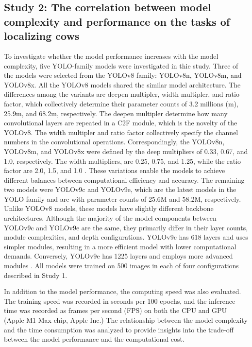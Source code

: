 \subsection*{Study 2: The correlation between model complexity and performance on the tasks of localizing cows}

To investigate whether the model performance increases with the model complexity, five YOLO-family models were investigated in thie study. Three of the models were selected from the YOLOv8 family: YOLOv8n, YOLOv8m, and YOLOv8x. All the YOLOv8 models shared the similar model architecture. The differences among the variants are deepen multipler, width multipler, and ratio factor, which collectively determine their parameter counts of 3.2 millions (m), 25.9m, and 68.2m, respectively. The deepen multipler determine how many convolutional layers are repeated in a C2F module, which is the novelty of the YOLOv8. The width multipler and ratio factor collectively specify the channel numbers in the convolutional operations. Correspondingly, the YOLOv8n, YOLOv8m, and YOLOv8x were defined by the deep multipliers of 0.33, 0.67, and 1.0, respectively. The width multipliers, are 0.25, 0.75, and 1.25, while the ratio factor are 2.0, 1.5, and 1.0 \cite{v8yaml}. These variations enable the models to achieve different balances between computational efficiency and accuracy. The remaining two models were YOLOv9c and YOLOv9e, which are the latest models in the YOLO family and are with parameter counts of 25.6M and 58.2M, respectively.  Unlike YOLOv8 models, these models have slightly different backbone architectures. Although the majority of the model components between YOLOv9c and YOLOv9e are the same, they primarily differ in their layer counts, module complexities, and depth configurations. YOLOv9c has 618 layers and uses simpler modules, resulting in a more efficient model with lower computational demands. Conversely, YOLOv9e has 1225 layers and employs more advanced modules \cite{v9yaml}. All models were trained on 500 images in each of four configurations described in Study 1.

In addition to the model performance, the computing speed was also evaluated. The training speed was recorded in seconds per 100 epochs, and the inference time was recorded as frames per second (FPS) on both the CPU and GPU (Apple M1 Max chip, Apple Inc.) The relationship between the model complexity and the time consumption was analyzed to provide insights into the trade-off between the model performance and the computational cost.

